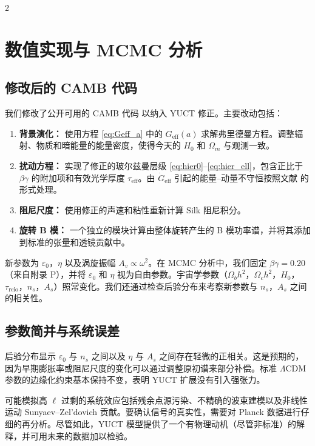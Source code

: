 \documentclass[11pt,a4paper]{article}
\begin{document}
	\begin{multicols}{2}
		
		\section{数值实现与 MCMC 分析}
		
		\subsection{修改后的 CAMB 代码}
		
		我们修改了公开可用的 CAMB 代码 \cite{Lewis2000} 以纳入 YUCT 修正。主要改动包括：
		\begin{enumerate}
			\item \textbf{背景演化：} 使用方程 \eqref{eq:Geff_a} 中的 $G_{\mathrm{eff}}(a)$ 求解弗里德曼方程。调整辐射、物质和暗能量的能量密度，使得今天的 $H_0$ 和 $\Omega_m$ 与观测一致。
			\item \textbf{扰动方程：} 实现了修正的玻尔兹曼层级 \eqref{eq:hier0}--\eqref{eq:hier_ell}，包含正比于 $\beta\gamma$ 的附加项和有效光学厚度 $\tau_{\mathrm{eff}}$。由 $\dot{G}_{\mathrm{eff}}$ 引起的能量–动量不守恒按照文献 \cite{Uzan2011} 的形式处理。
			\item \textbf{阻尼尺度：} 使用修正的声速和粘性重新计算 Silk 阻尼积分。
			\item \textbf{旋转 B 模：} 一个独立的模块计算由整体旋转产生的 B 模功率谱，并将其添加到标准的张量和透镜贡献中。
		\end{enumerate}
		新参数为 $\varepsilon_0$，$\eta$ 以及涡旋振幅 $A_v \propto \omega^2$。在 MCMC 分析中，我们固定 $\beta\gamma = 0.20$（来自附录 P），并将 $\varepsilon_0$ 和 $\eta$ 视为自由参数。宇宙学参数（$\Omega_b h^2$，$\Omega_c h^2$，$H_0$，$\tau_{\mathrm{reio}}$，$n_s$，$A_s$）照常变化。我们还通过检查后验分布来考察新参数与 $n_s$，$A_s$ 之间的相关性。
		
		\subsection{参数简并与系统误差}
		
		后验分布显示 $\varepsilon_0$ 与 $n_s$ 之间以及 $\eta$ 与 $A_s$ 之间存在轻微的正相关。这是预期的，因为早期膨胀率或阻尼尺度的变化可以通过调整原初谱来部分补偿。标准 $\Lambda$CDM 参数的边缘化约束基本保持不变，表明 YUCT 扩展没有引入强张力。
		
		可能模拟高 $\ell$ 过剩的系统效应包括残余点源污染、不精确的波束建模以及非线性运动 Sunyaev–Zel'dovich 贡献。要确认信号的真实性，需要对 Planck 数据进行仔细的再分析。尽管如此，YUCT 模型提供了一个有物理动机（尽管非标准）的解释，并可用未来的数据加以检验。
		

\end{multicols}
\end{document}
